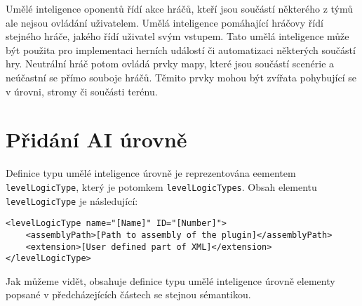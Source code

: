 Umělé inteligence oponentů řídí akce hráčů, kteří jsou součástí některého z týmů ale nejsou ovládání uživatelem. Umělá inteligence pomáhající hráčovy řídí stejného hráče, jakého řídí uživatel svým vstupem. Tato umělá inteligence může být použita pro implementaci herních událostí či automatizaci některých součástí hry. Neutrální hráč potom ovládá prvky mapy, které jsou součástí scenérie a neúčastní se přímo souboje hráčů. Těmito prvky mohou být zvířata pohybující se v úrovni, stromy či součásti terénu. 

\section{Přidání AI úrovně}
Definice typu umělé inteligence úrovně je reprezentována eementem \texttt{levelLogicType}, který je potomkem \texttt{levelLogicTypes}. Obsah elementu \texttt{levelLogicType} je následující:

\begin{lstlisting}
<levelLogicType name="[Name]" ID="[Number]">
	<assemblyPath>[Path to assembly of the plugin]</assemblyPath>
	<extension>[User defined part of XML]</extension>
</levelLogicType>
\end{lstlisting}
Jak můžeme vidět, obsahuje definice typu umělé inteligence úrovně elementy popsané v předcházejících částech se stejnou sémantikou.


